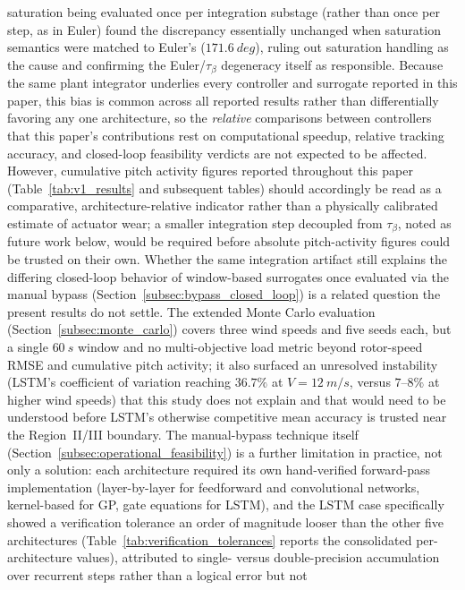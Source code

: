 saturation being evaluated once per integration substage (rather than
once per step, as in Euler) found the discrepancy essentially
unchanged when saturation semantics were matched to Euler's
($\SI{171.6}{deg}$), ruling out saturation handling as the cause and
confirming the Euler/$\tau_\beta$ degeneracy itself as responsible.
Because the same plant integrator underlies every controller and
surrogate reported in this paper, this bias is common across all
reported results rather than differentially favoring any one
architecture, so the \emph{relative} comparisons between controllers
that this paper's contributions rest on  computational speedup,
relative tracking accuracy, and closed-loop feasibility verdicts 
are not expected to be affected. However, cumulative pitch activity
figures reported throughout this paper (Table~\ref{tab:v1_results} and
subsequent tables) should accordingly be read as a comparative,
architecture-relative indicator rather than a physically calibrated
estimate of actuator wear; a smaller integration step decoupled from
$\tau_\beta$, noted as future work below, would be required before
absolute pitch-activity figures could be trusted on their own.
Whether the same integration artifact still explains the differing
closed-loop behavior of window-based surrogates once evaluated via the
manual bypass (Section~\ref{subsec:bypass_closed_loop}) is a related
question the present results do not settle. The
extended Monte Carlo evaluation (Section~\ref{subsec:monte_carlo}) covers
three wind speeds and five seeds each, but a single $\SI{60}{s}$ window
and no multi-objective load metric beyond rotor-speed RMSE and
cumulative pitch activity; it also surfaced an unresolved instability
(LSTM's coefficient of variation reaching $36.7\%$ at
$V=\SI{12}{m/s}$, versus $7$--$8\%$ at higher wind speeds) that this
study does not explain and that would need to be understood before
LSTM's otherwise competitive mean accuracy is trusted near the
Region~II/III boundary. The manual-bypass technique itself
(Section~\ref{subsec:operational_feasibility}) is a further limitation
in practice, not only a solution: each architecture required its own
hand-verified forward-pass implementation (layer-by-layer for
feedforward and convolutional networks, kernel-based for GP, gate
equations for LSTM), and the LSTM case specifically showed a
verification tolerance an order of magnitude looser than the other
five architectures (Table~\ref{tab:verification_tolerances} reports
the consolidated per-architecture values), attributed to single-
versus double-precision
accumulation over recurrent steps rather than a logical error but not
